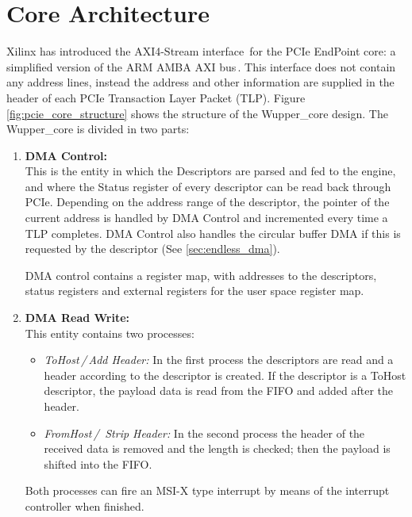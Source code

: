 \section{Core Architecture}
Xilinx has introduced the AXI4-Stream interface\,\cite{ug761} for the PCIe EndPoint core: a simplified version of the ARM AMBA AXI bus\,\cite{arm_amba}. This interface does not contain any address lines, instead the address and other information are supplied in the header of each PCIe Transaction Layer Packet (TLP). Figure\,\ref{fig:pcie_core_structure} shows the structure of the Wupper\_core design. The Wupper\_core is divided in two parts:
\begin{enumerate}
\item \textbf{DMA Control:} \\This is the entity in which the Descriptors are parsed and fed to the engine, and where the Status register of every descriptor can be read back through PCIe. Depending on the address range of the descriptor, the pointer of the current address is handled by DMA Control and incremented every time a TLP completes. DMA Control also handles the circular buffer DMA if this is requested by the descriptor (See \ref{sec:endless_dma}).

DMA control contains a register map, with addresses to the descriptors, status registers and external registers for the user space register map. 

\item \textbf{DMA Read Write:} \\This entity contains two processes:
\begin{itemize}
\item \textit{ToHost\,/\,Add Header:} In the first process the descriptors are read and a header according to the descriptor is created. If the descriptor is a ToHost descriptor, the payload data is read from the FIFO and added after the header.
\item \textit{FromHost\,/ \,Strip Header:} In the second process the header of the received data is removed and the length is checked; then the payload is shifted into the FIFO.
\end{itemize}

Both processes can fire an MSI-X type interrupt by means of the interrupt controller when finished.
\end{enumerate}

